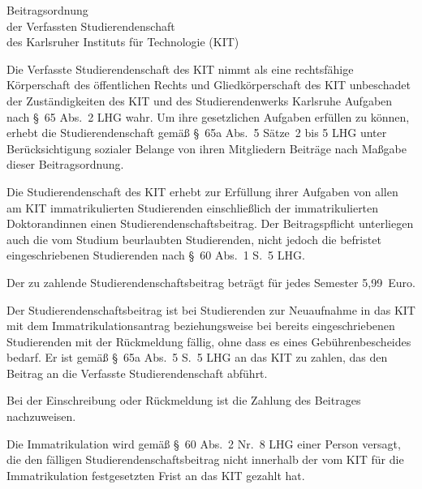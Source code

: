 

\begin{jurdoc}[Beitragsordnung]{Beitragsordnung\\der Verfassten Studierendenschaft\\des Karlsruher Instituts für Technologie (KIT)}\label{beitragsordnung}

\label{beitragsordnung:zweck}
Die Verfasste Studierendenschaft des KIT nimmt als eine rechtsfähige Körperschaft des öffentlichen Rechts und Gliedkörperschaft des KIT unbeschadet der Zuständigkeiten des KIT und des Studierendenwerks Karlsruhe Aufgaben nach §~65 Abs.~2 LHG wahr. Um ihre gesetzlichen Aufgaben erfüllen zu können, erhebt die Studierendenschaft gemäß §~65a Abs.~5 Sätze~2 bis 5 LHG unter Berücksichtigung sozialer Belange von ihren Mitgliedern Beiträge nach Maßgabe dieser Beitragsordnung.

\label{beitragsordnung:pflicht}
Die Studierendenschaft des KIT erhebt zur Erfüllung ihrer Aufgaben von allen am KIT immatrikulierten Studierenden einschließlich der immatrikulierten Doktorandinnen einen Studierendenschaftsbeitrag. Der Beitragspflicht unterliegen auch die vom Studium beurlaubten Studierenden, nicht jedoch die befristet eingeschriebenen Studierenden nach §~60 Abs.~1 S.~5 LHG.

\label{beitragsordnung:hoehe}
Der zu zahlende Studierendenschaftsbeitrag beträgt für jedes Semester 5,99~Euro.

\label{beitragsordnung:faelligkeit}
Der Studierendenschaftsbeitrag ist bei Studierenden zur Neuaufnahme in das KIT mit dem Immatrikulationsantrag beziehungsweise bei bereits eingeschriebenen Studierenden mit der Rückmeldung fällig, ohne dass es eines Gebührenbescheides bedarf. Er ist gemäß §~65a Abs.~5 S.~5 LHG an das KIT zu zahlen, das den Beitrag an die Verfasste Studierendenschaft abführt.

Bei der Einschreibung oder Rückmeldung ist die Zahlung des Beitrages nachzuweisen.

Die Immatrikulation wird gemäß §~60 Abs.~2 Nr.~8 LHG einer Person versagt, die den fälligen Studierendenschaftsbeitrag nicht innerhalb der vom KIT für die Immatrikulation festgesetzten Frist an das KIT gezahlt hat.


\end{jurdoc}
